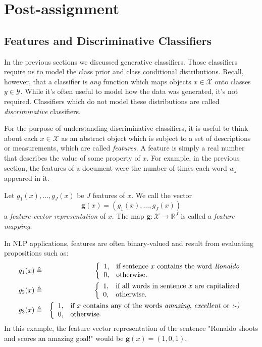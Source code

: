 \section{Post-assignment}

\subsection{Features and Discriminative Classifiers}\label{sec:linearclass}

In the previous sections we discussed generative classifiers. Those classifiers require us to model the class prior and class conditional distributions. Recall, however, that a classifier is \emph{any} function which maps objects $x \in \mathcal{X}$ onto classes $y \in \mathcal{Y}$. While it's often useful to model how the data was generated, it's not required. Classifiers which do not model these distributions are called \emph{discriminative} classifiers. 

For the purpose of understanding discriminative classifiers, it is useful to think about each  $x \in \mathcal{X}$ as an abstract object which is subject to a set of descriptions or measurements, which are called \emph{features}. A feature is simply a real number that describes the value of some property of $x$. For example, in the previous section, the features of a document were the number of times each word $w_j$ appeared in it.

Let $g_1(x),\ldots,g_J(x)$ be $J$ features of $x$. We call the vector
\begin{equation}
\boldsymbol{g}(x) = (g_1(x),\ldots,g_J(x))
\end{equation} 
a \emph{feature vector representation} of $x$. 
The map $\boldsymbol{g}:\mathcal{X}\rightarrow \mathbb{R}^J$ is called a \emph{feature mapping}. 

In NLP applications, features are often binary-valued and result from evaluating propositions such as: 
\begin{eqnarray}
g_1(x) &\triangleq& 
\left\{
\begin{array}{ll}
1, & \text{if sentence $x$ contains the word \emph{Ronaldo}}\\
0, & \text{otherwise.}
\end{array}
\right.\\
g_2(x) &\triangleq& 
\left\{
\begin{array}{ll}
1, & \text{if all words in sentence $x$ are capitalized}\\
0, & \text{otherwise.}
\end{array}
\right.\\
g_3(x) &\triangleq& 
\left\{
\begin{array}{ll}
1, & \text{if $x$ contains any of the words \emph{amazing}, \emph{excellent} or \emph{:-)}}\\
0, & \text{otherwise.}
\end{array}
\right.
\end{eqnarray}  
In this example, the feature vector representation of the sentence "Ronaldo shoots and scores an amazing goal!" would be $\boldsymbol{g}(x) = (1,0,1)$. 

